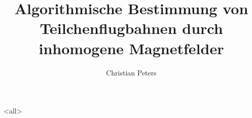 \documentclass[ngerman, ignorenonframetext]{beamer}
\title[Algorithmische Bestimmung von Teilchenflugbahnen]{Algorithmische Bestimmung von Teilchenflugbahnen durch inhomogene Magnetfelder}
\author{Christian Peters}
\begin{document}
\mode<all>
\begin{frame}
  \maketitle
\end{frame}











\begin{frame}[allowframebreaks]
  \nocite{*}
  \printbibliography
\end{frame}

\mode*
\end{document}
